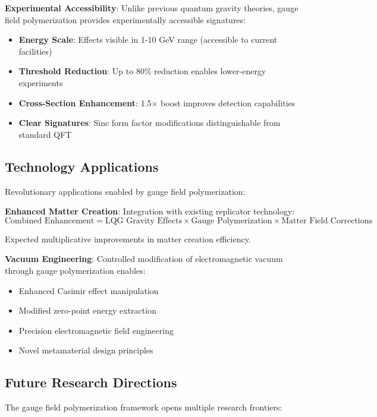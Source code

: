 \documentclass[11pt]{article}
\begin{document}
\textbf{Experimental Accessibility}:
Unlike previous quantum gravity theories, gauge field polymerization provides experimentally accessible signatures:
\begin{itemize}
\item \textbf{Energy Scale}: Effects visible in 1-10 GeV range (accessible to current facilities)
\item \textbf{Threshold Reduction}: Up to 80\% reduction enables lower-energy experiments
\item \textbf{Cross-Section Enhancement}: 1.5× boost improves detection capabilities
\item \textbf{Clear Signatures}: Sinc form factor modifications distinguishable from standard QFT
\end{itemize}

\subsection{Technology Applications}

Revolutionary applications enabled by gauge field polymerization:

\textbf{Enhanced Matter Creation}:
Integration with existing replicator technology:
\begin{equation}
\text{Combined Enhancement} = \text{LQG Gravity Effects} \times \text{Gauge Polymerization} \times \text{Matter Field Corrections}
\end{equation}

Expected multiplicative improvements in matter creation efficiency.

\textbf{Vacuum Engineering}:
Controlled modification of electromagnetic vacuum through gauge polymerization enables:
\begin{itemize}
\item Enhanced Casimir effect manipulation
\item Modified zero-point energy extraction
\item Precision electromagnetic field engineering
\item Novel metamaterial design principles
\end{itemize}

\subsection{Future Research Directions}

The gauge field polymerization framework opens multiple research frontiers:
\end{document}
